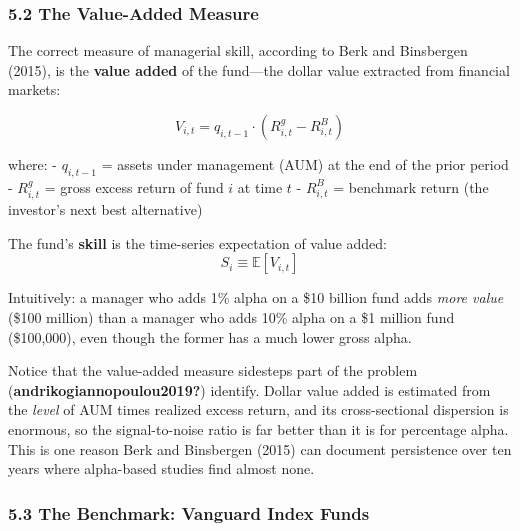 \documentclass[
  letterpaper,
  DIV=11,
  numbers=noendperiod]{scrartcl}
\newcounter{none} %
\begin{document}
\subsubsection{5.2 The Value-Added
Measure}\label{the-value-added-measure}

The correct measure of managerial skill, according to Berk and
Binsbergen (2015), is the \textbf{value added} of the fund---the dollar
value extracted from financial markets:

\[V_{i,t} = q_{i,t-1} \cdot (R_{i,t}^g - R_{i,t}^B) \tag{4}\]

where: - \(q_{i,t-1}\) = assets under management (AUM) at the end of the
prior period - \(R_{i,t}^g\) = gross excess return of fund \(i\) at time
\(t\) - \(R_{i,t}^B\) = benchmark return (the investor's next best
alternative)

The fund's \textbf{skill} is the time-series expectation of value added:
\[S_i \equiv \mathbb{E}[V_{i,t}] \tag{5}\]

Intuitively: a manager who adds 1\% alpha on a \$10 billion fund adds
\emph{more value} (\$100 million) than a manager who adds 10\% alpha on
a \$1 million fund (\$100,000), even though the former has a much lower
gross alpha.

\begin{tcolorbox}[enhanced jigsaw, arc=.35mm, bottomrule=.15mm, bottomtitle=1mm, breakable, colback=white, colbacktitle=quarto-callout-tip-color!10!white, colframe=quarto-callout-tip-color-frame, coltitle=black, left=2mm, leftrule=.75mm, opacityback=0, opacitybacktitle=0.6, rightrule=.15mm, title=\textcolor{quarto-callout-tip-color}{\faLightbulb}\hspace{0.5em}{Tip}, titlerule=0mm, toprule=.15mm, toptitle=1mm]

Notice that the value-added measure sidesteps part of the problem
(\textbf{andrikogiannopoulou2019?}) identify. Dollar value added is
estimated from the \emph{level} of AUM times realized excess return, and
its cross-sectional dispersion is enormous, so the signal-to-noise ratio
is far better than it is for percentage alpha. This is one reason Berk
and Binsbergen (2015) can document persistence over ten years where
alpha-based studies find almost none.

\end{tcolorbox}

\subsubsection{5.3 The Benchmark: Vanguard Index
Funds}\label{the-benchmark-vanguard-index-funds}
\end{document}
